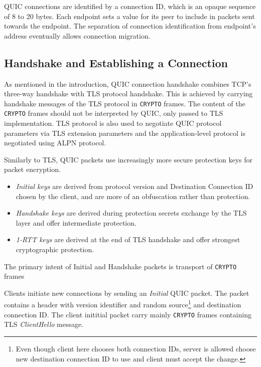 QUIC connections are identified by a connection ID, which is an opaque sequence of 8 to 20 bytes.
Each endpoint sets a value for its peer to include in packets sent towards the endpoint. The
separation of connection identification from endpoint's address eventually allows connection
migration.

\subsection{Handshake and Establishing a Connection}

As mentioned in the introduction, QUIC connection handshake combines TCP's three-way handshake with
TLS protocol handshake. This is achieved by carrying handshake messages of the TLS protocol in
\texttt{CRYPTO} frames. The content of the \texttt{CRYPTO} frames should not be interpreted by QUIC,
only passed to TLS implementation. TLS protocol is also used to negotiate QUIC protocol parameters
via TLS extension parameters and the application-level protocol is negotiated using ALPN
 protocol.

Similarly to TLS, QUIC packets use increasingly more secure
protection keys for packet encryption.

\begin{itemize}
  \item \textit{Initial keys} are derived from protocol version and Destination Connection ID chosen
    by the client, and are more of an obfuscation rather than protection.
  \item \textit{Handshake keys} are derived during protection secrets exchange by the TLS layer and
    offer intermediate protection.
  \item \textit{1-RTT keys} are derived at the end of TLS handshake and offer strongest
    cryptographic protection.
\end{itemize}

The primary intent of Initial and Handshake packets is transport of \texttt{CRYPTO} frames


Clients initiate new connections by sending an \textit{Initial} QUIC packet. The packet contains a
header with version identifier and random  source\footnote{Even though
client here chooses both connection IDs, server is allowed choose new destination connection ID to
use and client must accept the change.} and destination connection ID\@. The client inititial packet
carry mainly \texttt{CRYPTO} frames containing TLS \textit{ClientHello} message.


